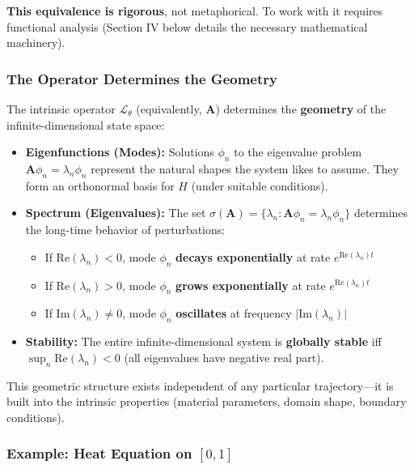 \documentclass[
]{article}
\providecommand{\tightlist}{%
  \setlength{\itemsep}{0pt}\setlength{\parskip}{0pt}}
\begin{document}
\textbf{This equivalence is rigorous}, not metaphorical. To work with it
requires functional analysis (Section IV below details the necessary
mathematical machinery).

\subsubsection{The Operator Determines the
Geometry}\label{the-operator-determines-the-geometry}

The intrinsic operator \(\mathcal{L}_\theta\) (equivalently,
\(\mathbf{A}\)) determines the \textbf{geometry} of the
infinite-dimensional state space:

\begin{itemize}
\item
  \textbf{Eigenfunctions (Modes):} Solutions \(\phi_n\) to the
  eigenvalue problem \(\mathbf{A}\phi_n = \lambda_n\phi_n\) represent
  the natural shapes the system likes to assume. They form an
  orthonormal basis for \(H\) (under suitable conditions).
\item
  \textbf{Spectrum (Eigenvalues):} The set
  \(\sigma(\mathbf{A}) = \{\lambda_n : \mathbf{A}\phi_n = \lambda_n\phi_n\}\)
  determines the long-time behavior of perturbations:

  \begin{itemize}
  \tightlist
  \item
    If \(\text{Re}(\lambda_n) < 0\), mode \(\phi_n\) \textbf{decays
    exponentially} at rate \(e^{\text{Re}(\lambda_n) t}\)
  \item
    If \(\text{Re}(\lambda_n) > 0\), mode \(\phi_n\) \textbf{grows
    exponentially} at rate \(e^{\text{Re}(\lambda_n) t}\)
  \item
    If \(\text{Im}(\lambda_n) \neq 0\), mode \(\phi_n\)
    \textbf{oscillates} at frequency \(|\text{Im}(\lambda_n)|\)
  \end{itemize}
\item
  \textbf{Stability:} The entire infinite-dimensional system is
  \textbf{globally stable} iff \(\sup_n \text{Re}(\lambda_n) < 0\) (all
  eigenvalues have negative real part).
\end{itemize}

This geometric structure exists independent of any particular
trajectory---it is built into the intrinsic properties (material
parameters, domain shape, boundary conditions).

\subsubsection{\texorpdfstring{Example: Heat Equation on
\([0,1]\)}{Example: Heat Equation on {[}0,1{]}}}\label{example-heat-equation-on-01}
\end{document}
